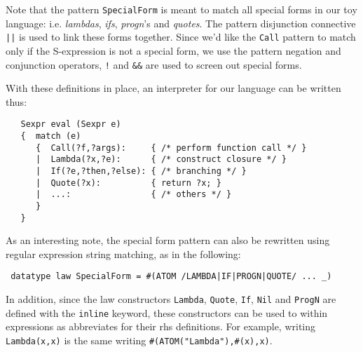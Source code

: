 Note that the pattern \verb|SpecialForm| is meant to match all
special forms in our toy language: i.e. {\em lambdas}, {\em ifs}, {\em progn}'s
and {\em quotes}.  The pattern disjunction connective \verb.||. is used
to link these forms together.  Since we'd like the \verb|Call| pattern
to match only if the S-expression is not a special form, we use
the pattern negation and conjunction operators, \verb|!| and \verb|&&|
are used to screen out special forms.  


With these definitions in place,
an interpreter for our language can be written thus:
 
\begin{verbatim}
   Sexpr eval (Sexpr e)
   {  match (e)
      {  Call(?f,?args):     { /* perform function call */ }
      |  Lambda(?x,?e):      { /* construct closure */ }
      |  If(?e,?then,?else): { /* branching */ }
      |  Quote(?x):          { return ?x; }
      |  ...:                { /* others */ }
      }
   }
\end{verbatim}


As an interesting note, the special form pattern can also be rewritten
using regular expression string matching, as in the following:
 
\begin{verbatim}
 datatype law SpecialForm = #(ATOM /LAMBDA|IF|PROGN|QUOTE/ ... _)
\end{verbatim}
 
In addition, since the law constructors \verb|Lambda|, \verb|Quote|,
\verb|If|, \verb|Nil| and \verb|ProgN| are defined with the \verb|inline|
keyword, these constructors can be used to within expressions as abbreviates
for their rhs definitions.  For example, writing
\verb|Lambda(x,x)| is the same writing \verb|#(ATOM("Lambda"),#(x),x)|.

 
